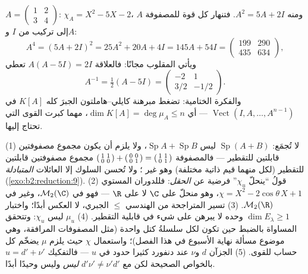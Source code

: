 \begin{example}\label{ex:b2:reduction:chwork}
$A = \begin{pmatrix} 1 & 2\\ 3 & 4\end{pmatrix}$: $\chi_A = X^2 -
5X - 2$، ومنه $A^2 = 5A + 2I$. فتنهار كل قوة للمصفوفة $A$ إلى
تركيب من $I$ و$A$:
\[
A^4 = (5A + 2I)^2 = 25A^2 + 20A + 4I = 145A + 54I =
\begin{pmatrix} 199 & 290\\ 435 & 634\end{pmatrix},
\]
ويأتي المقلوب مجانًا: فالعلاقة $A(A - 5I) = 2I$ تعطي
\[
A^{-1} = \tfrac12(A - 5I)
= \begin{pmatrix} -2 & 1\\ 3/2 & -1/2\end{pmatrix}.
\]
والفكرة الختامية: تضغط مبرهنة كايلي--هاملتون الجبرَ كله
$K[A]$ في $\operatorname{Vect}(I, A, \dots, A^{n-1})$ ---
أي $\dim K[A] = \deg\mu_A \leq n$، مهما كبرت القوى التي تحتاج إليها.
\end{example}

\begin{remark}\label{rem:b2:reduction:pitfalls}
(1)  لا تُجمَع:  $\operatorname{Sp}(A + B)$ ليس
$\operatorname{Sp}A + \operatorname{Sp}B$، ولا يلزم أن يكون مجموع مصفوفتين قابلتين
للتقطير  --- فالمصفوفة $\begin{psmallmatrix}1 & 1\\ 0 & 0\end{psmallmatrix} +
\begin{psmallmatrix}0 & 0\\ 0 & 1\end{psmallmatrix} =
\begin{psmallmatrix}1 & 1\\ 0 & 1\end{psmallmatrix}$ مجموع
مصفوفتين قابلتين للتقطير (لكل منهما قيم ذاتية مختلفة)
وهو غير ؛ ولا تُحسن السلوك إلا العائلات
\emph{المتبادلة} (\cref{exo:b2:reduction:9}). (2) قولُ ``ينحلّ $\chi_u$'' فرضية
عن \emph{الحقل}: فللدوران المستوي $\chi =
X^2 - 2\cos\theta\,X + 1$، وهو منحلّ على $\C$ لا على $\R$ ---
فهو  في $\mathcal{M}_2(\C)$، وغير  في
$\mathcal{M}_2(\R)$. (3) تسير المتراجحة من الهندسي $\leq$
الجبري، لا العكس أبدًا؛ واختبار $\dim E_\lambda \geq
1$ وحده لا يبرهن على شيء في قابلية التقطير. (4) $\mu_u$ ليس
$\chi_u$: وتتحقق المساواة بالضبط حين تكون لكل 
سلسلةُ كتل واحدة (مثل المصفوفات المرافقة، وهي موضوع مسألة نهاية
الأسبوع في هذا الفصل)؛ واستعمال $\chi$ حيث يلزم $\mu$ يضخّم
كل حساب للقوى. (5) الجزآن $d$ و$\nu$ عند دنفورد
كثيرا حدود في $u$ --- فالتفكيك $u = d' + \nu'$ بالخواص
الصحيحة لكن مع $d'\nu' \neq \nu'd'$ \emph{ليس} 
وليس وحيدًا أبدًا.
\end{remark}

